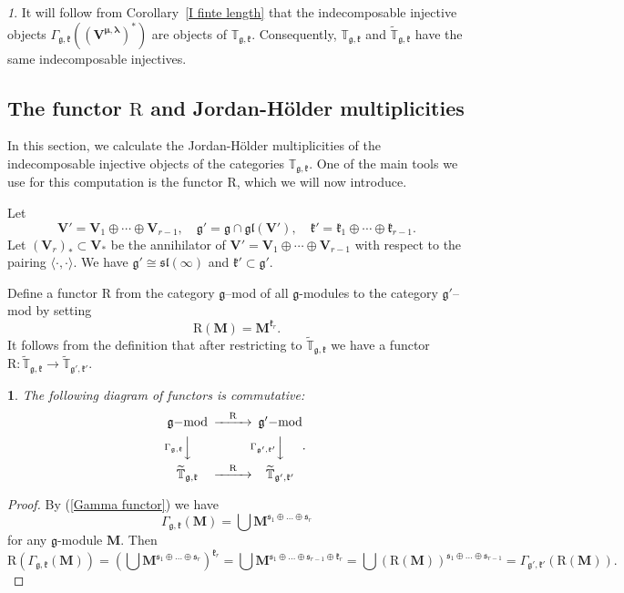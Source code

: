 \documentclass[12pt,oneside,english]{amsart}
\numberwithin{equation}{section}
\numberwithin{figure}{section}
\theoremstyle{plain}
\theoremstyle{plain}
\newtheorem{lem}[thm]{\protect\lemmaname}
\theoremstyle{remark}
\newtheorem{rem}[thm]{\protect\remarkname}
\theoremstyle{definition}
\theoremstyle{plain}
\theoremstyle{remark}
\theoremstyle{definition}
\theoremstyle{plain}
\theoremstyle{plain}
\theoremstyle{definition}
\providecommand{\lemmaname}{Lemma}
\providecommand{\remarkname}{Remark}
\newcommand{\bV}{\mathbf{V}}
\newcommand{\bM}{\mathbf{M}}
\newcommand{\fg}{\mathfrak{g}}
\newcommand{\fk}{\mathfrak{k}}
\newcommand{\fs}{\mathfrak{s}}
\begin{document}
\begin{rem}
It will follow from Corollary~\ref{I finte length} that the indecomposable injective objects $\Gamma_{\fg,\fk}((\bV^{{\boldsymbol{\mu}},\boldsymbol{\lambda}})^*)$ are objects of $\mathbb{T}_{\fg,\fk}$. Consequently,
 $\mathbb{T}_{\fg,\fk}$ and  $\widetilde{\mathbb{T}}_{\fg,\fk}$ have the same indecomposable injectives.
\end{rem}




\subsection{The functor $\mathrm{R}$ and Jordan-H\"older multiplicities}

In this section, we calculate the Jordan-H\"older multiplicities of the indecomposable injective objects of the categories $\mathbb{T}_{\fg,\fk}$. One of the main tools we use for this computation is the functor $\mathrm{R}$, which we will now introduce.

Let
\begin{equation}\label{decomp Vr}
\bV'=\bV_1\oplus\cdots\oplus\bV_{r-1}, \quad \fg'=\fg\cap \mathfrak{gl}(\bV'),\quad\fk'=\fk_1\oplus\cdots\oplus\fk_{r-1}.
\end{equation}
 Let $(\bV_r)_*\subset \bV_*$ be the annihilator of $\bV'=\bV_1\oplus\cdots\oplus\bV_{r-1}$ with respect to the pairing $\langle\cdot,\cdot\rangle$.
 We have $\fg'\cong\mathfrak{sl}(\infty)$ and $\fk'\subset\fg'$.

Define a functor $\mathrm{R}$ from the category $\fg$--mod of all $\fg$-modules to the category $\fg'$--mod by setting
$$\mathrm{R}(\bM)=\bM^{\fk_r}.$$
It follows from the definition that after restricting to $ \widetilde{\mathbb T}_{\fg,\fk}$ we have a functor
$\mathrm{R}: \widetilde{\mathbb T}_{\fg,\fk}\to  \widetilde{\mathbb T}_{\fg',\fk'}$.



\begin{lem}\label{lem:commutative} The following diagram of functors is commutative:
  $$\begin{CD}
\mathfrak{g}\mathrm{-mod} @>\mathrm{R}>>{\mathfrak{g'}}\mathrm{-mod}\\
@V\Gamma_{\fg,\fk}VV @V\Gamma_{\fg',\fk'}VV \\
\widetilde{\mathbb{T}}_{\fg,\fk} @>\mathrm{R}>>\widetilde{ \mathbb{T}}_{\fg',\fk'}
\end{CD}.\notag$$
\end{lem}
\begin{proof} By (\ref{Gamma functor}) we have
  $$\Gamma_{\fg,\fk}(\bM)=\bigcup \bM^{\fs_1\oplus\dots\oplus\fs_r}$$
 for any $\fg$-module $\bM$. Then
$$\mathrm{R}(\Gamma_{\fg,\fk}(\bM))=(\bigcup \bM^{\fs_1\oplus\dots\oplus\fs_r})^{\fk_r}=\bigcup \bM^{\fs_1\oplus\dots\oplus\fs_{r-1}\oplus\fk_r}=\bigcup (\mathrm{R}(\bM))^{\fs_1\oplus\dots\oplus\fs_{r-1}}=
\Gamma_{\fg',\fk'}(\mathrm{R}(\bM)).$$
  \end{proof}
\end{document}

